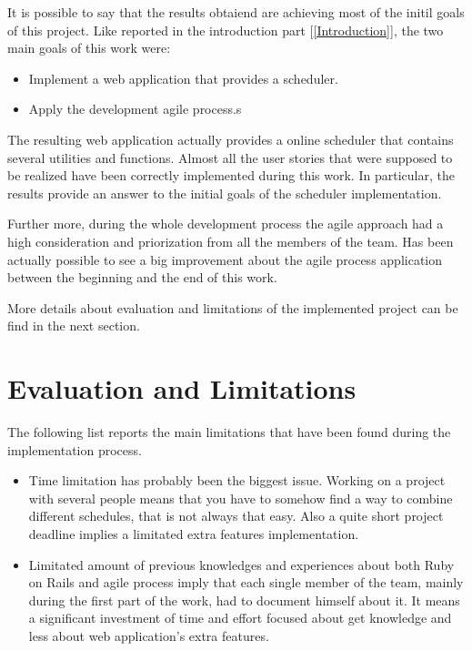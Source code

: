 It is possible to say that the results obtaiend are achieving most of the initil goals of this project. 
Like reported in the introduction part [\ref{Introduction}], the two main goals of this work were: 
\vspace{-10mm}
\begin{itemize}
 \setlength{\itemsep}{-5pt}
 \item Implement a web application that provides a scheduler.
 \item Apply the development agile process.s
\end{itemize}

The resulting web application actually provides a online scheduler that contains several utilities and functions. Almost all the user stories that were supposed to be realized have been correctly implemented during this work. In particular, the results provide an answer to the initial goals of the scheduler implementation. 

Further more, during the whole development process the agile approach had a high consideration and priorization from all the members of the team. Has been actually possible to see a big improvement about the agile process application between the beginning and the end of this work.

More details about evaluation and limitations of the implemented project can be find in the next section.
\section{Evaluation and Limitations}
\label{Evaluation}
The following list reports the main limitations that have been found during the implementation process.
\vspace{-5mm}
\begin{itemize}
 \setlength{\itemsep}{-5pt}
\item Time limitation has probably been the biggest issue. Working on a project with several people means that you have to somehow find a way to combine different schedules, that is not always that easy. Also a quite short project deadline implies a limitated extra features implementation.
\item Limitated amount of previous knowledges and experiences about both Ruby on Rails and agile process imply that each single member of the team, mainly during the first part of the work, had to document himself about it. It means a significant investment of time and effort focused about get knowledge and less about web application's extra features. 
\end{itemize}


